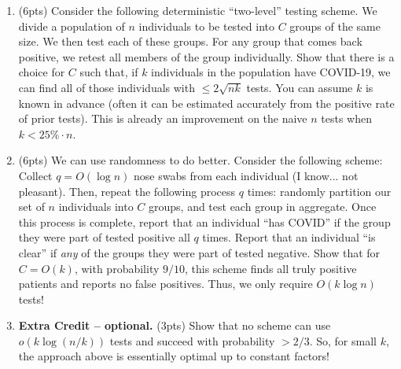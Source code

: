 \documentclass[10pt]{article}
\begin{document}
\begin{enumerate}
	\item (6pts) Consider the following deterministic ``two-level'' testing scheme. We divide a population of $n$ individuals to be tested into $C$ groups of the same size. We then test each of these groups. For any group that comes back positive, we retest all members of the group individually. Show that there is a choice for $C$ such that, if $k$ individuals in the population have COVID-19, we can find all of those individuals with $\leq 2\sqrt{nk}$ tests. You can assume $k$ is known in advance (often it can be estimated accurately from the positive rate of prior tests). This is already an improvement on the naive $n$ tests when $k < 25\% \cdot n$.
	
	\item (6pts) We can use randomness to do better. Consider the following scheme: Collect $q = O(\log n)$ nose swabs from each individual (I know... not pleasant). Then, repeat the following process $q$ times: randomly partition our set of $n$ individuals into $C$ groups, and test each group in aggregate. Once this process is complete, report that an individual ``has COVID'' if the group they were part of tested positive all $q$ times. Report that an individual ``is clear'' if \emph{any} of the groups they were part of tested negative. Show that for $C = O(k)$, with probability $9/10$, this scheme finds all truly positive patients and reports no false positives. Thus, we only require $O(k\log n)$ tests! 
	
	
	\item \textbf{Extra Credit -- optional.} (3pts) Show that no scheme can use $o(k\log(n/k))$ tests and succeed with probability $> 2/3$. So, for small $k$, the approach above is essentially optimal up to constant factors!
\end{enumerate}
\end{document}

